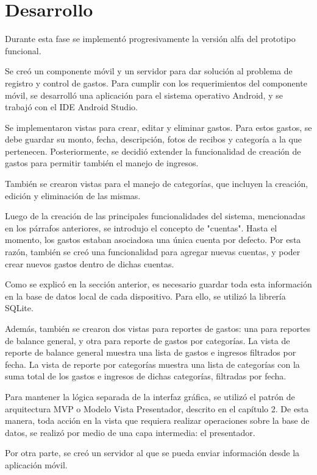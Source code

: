 \section{Desarrollo} \label{sect:desarrollo}

Durante esta fase se implementó progresivamente la versión alfa del prototipo funcional. 

Se creó un componente móvil y un servidor para dar solución al problema de registro y control de gastos.
Para cumplir con los requerimientos del componente móvil, se desarrolló una aplicación para el sistema operativo Android, y se trabajó con el IDE Android Studio.

Se implementaron vistas para crear, editar y eliminar gastos. Para estos gastos, se debe guardar su monto, fecha, descripción, fotos de recibos y categoría a la que pertenecen. Posteriormente, se decidió extender la funcionalidad de creación de gastos para permitir también el manejo de ingresos. 

También se crearon vistas para el manejo de categorías, que incluyen la creación, edición y eliminación de las mismas.

Luego de la creación de las principales funcionalidades del sistema, mencionadas en los párrafos anteriores, se introdujo el concepto de "cuentas". Hasta el momento, los gastos estaban asociadosa una única cuenta por defecto. Por esta razón, también se creó una funcionalidad para agregar nuevas cuentas, y poder crear nuevos gastos dentro de dichas cuentas.

Como se explicó en la sección anterior, es necesario guardar toda esta información en la base de datos local de cada dispositivo. Para ello, se utilizó la librería SQLite.

Además, también se crearon dos vistas para reportes de gastos: una para reportes de balance general, y otra para reporte de gastos por categorías.
La vista de reporte de balance general muestra una lista de gastos e ingresos filtrados por fecha. La vista de reporte por categorías muestra una lista de categorías con la suma total de los gastos e ingresos de dichas categorías, filtradas por fecha.

Para mantener la lógica separada de la interfaz gráfica, se utilizó el patrón de arquitectura MVP o Modelo Vista Presentador, descrito en el capítulo 2. De esta manera, toda acción en la vista que requiera realizar operaciones sobre la base de datos, se realizó por medio de una capa intermedia: el presentador.

Por otra parte, se creó un servidor al que se pueda enviar información desde la aplicación móvil. 

